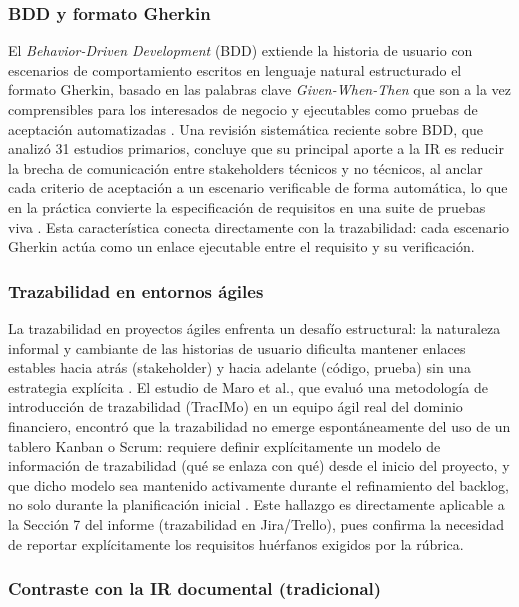 \documentclass[journal,onecolumn]{IEEEtran}
\begin{document}
	\subsubsection{BDD y formato Gherkin}
	
	El \emph{Behavior-Driven Development} (BDD) extiende la historia de usuario con escenarios de comportamiento escritos en lenguaje natural estructurado el formato Gherkin, basado en las palabras clave \emph{Given-When-Then} que son a la vez comprensibles para los interesados de negocio y ejecutables como pruebas de aceptación automatizadas \cite{farooq2023}. Una revisión sistemática reciente sobre BDD, que analizó 31 estudios primarios, concluye que su principal aporte a la IR es reducir la brecha de comunicación entre stakeholders técnicos y no técnicos, al anclar cada criterio de aceptación a un escenario verificable de forma automática, lo que en la práctica convierte la especificación de requisitos en una suite de pruebas viva \cite{farooq2023}. Esta característica conecta directamente con la trazabilidad: cada escenario Gherkin actúa como un enlace ejecutable entre el requisito y su verificación.
	
	\subsubsection{Trazabilidad en entornos ágiles}
	
	La trazabilidad en proyectos ágiles enfrenta un desafío estructural: la naturaleza informal y cambiante de las historias de usuario dificulta mantener enlaces estables hacia atrás (stakeholder) y hacia adelante (código, prueba) sin una estrategia explícita \cite{maro2022tracimo}. El estudio de Maro et al., que evaluó una metodología de introducción de trazabilidad (TracIMo) en un equipo ágil real del dominio financiero, encontró que la trazabilidad no emerge espontáneamente del uso de un tablero Kanban o Scrum: requiere definir explícitamente un modelo de información de trazabilidad (qué se enlaza con qué) desde el inicio del proyecto, y que dicho modelo sea mantenido activamente durante el refinamiento del backlog, no solo durante la planificación inicial \cite{maro2022tracimo}. Este hallazgo es directamente aplicable a la Sección 7 del informe (trazabilidad en Jira/Trello), pues confirma la necesidad de reportar explícitamente los requisitos huérfanos exigidos por la rúbrica.
	
	\subsubsection{Contraste con la IR documental (tradicional)}
	
\end{document}
